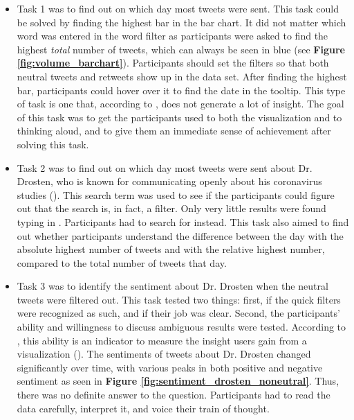 \begin{itemize}
    \item Task 1 was to find out on which day most tweets were sent. This task could be solved by finding the highest bar in the bar chart. It did not matter which word was entered in the word filter as participants were asked to find the highest \emph{total} number of tweets, which can always be seen in blue (see \textbf{Figure \ref{fig:volume_barchart}}). Participants should set the filters so that both neutral tweets and retweets show up in the data set. After finding the highest bar, participants could hover over it to find the date in the tooltip. This type of task is one that, according to \citeauthor{northMeasuringVisualizationInsight2006}, does not generate a lot of insight. The goal of this task was to get the participants used to both the visualization and to thinking aloud, and to give them an immediate sense of achievement after solving this task.
    \item Task 2 was to find out on which day most tweets were sent about Dr. Drosten, who is known for communicating openly about his coronavirus studies (\cite{henleyCoronavirusMeetScientists2020}). This search term was used to see if the participants could figure out that the search is, in fact, a filter. Only very little results were found typing in . Participants had to search for  instead. This task also aimed to find out whether participants understand the difference between the day with the absolute highest number of tweets and with the relative highest number, compared to the total number of tweets that day.
    \item Task 3 was to identify the sentiment about Dr. Drosten when the neutral tweets were filtered out. This task tested two things: first, if the quick filters were recognized as such, and if their job was clear. Second, the participants' ability and willingness to discuss ambiguous results were tested. According to \citeauthor{northMeasuringVisualizationInsight2006}, this ability is an indicator to measure the insight users gain from a visualization (\cite{northMeasuringVisualizationInsight2006}). The sentiments of tweets about Dr. Drosten changed significantly over time, with various peaks in both positive and negative sentiment as seen in \textbf{Figure \ref{fig:sentiment_drosten_noneutral}}. Thus, there was no definite answer to the question. Participants had to read the data carefully, interpret it, and voice their train of thought.
    \begin{figure}[htb]

\end{figure}
\end{itemize}
